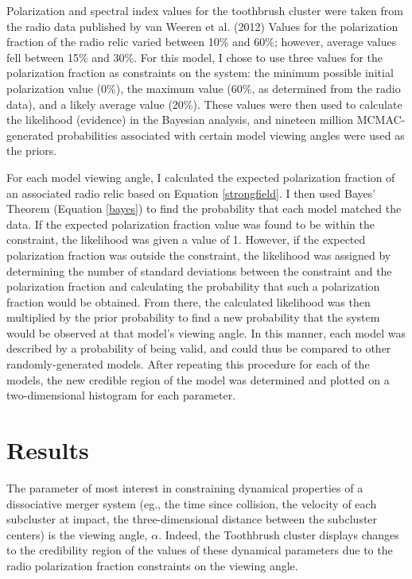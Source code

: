 \documentclass[12 pt]{article}
\begin{document}
Polarization and spectral index values for the toothbrush cluster were taken from the radio data published by van Weeren et al. (2012) Values for the polarization fraction of the radio relic varied between 10\% and 60\%; however, average values fell between 15\% and 30\%. For this model, I chose to use three values for the polarization fraction as constraints on the system: the minimum possible initial polarization value (0\%), the maximum value (60\%, as determined from the radio data), and a likely average value (20\%). These values were then used to calculate the likelihood (evidence) in the Bayesian analysis, and nineteen million MCMAC-generated probabilities associated with certain model viewing angles were used as the priors.

For each model viewing angle, I calculated the expected polarization fraction of an associated radio relic based on Equation \ref{strongfield}. I then used Bayes' Theorem (Equation \ref{bayes}) to find the probability that each model matched the data. If the expected polarization fraction value was found to be within the constraint, the likelihood was given a value of 1. However, if the expected polarization fraction was outside the constraint, the likelihood was assigned by determining the number of standard deviations between the constraint and the polarization fraction and calculating the probability that such a polarization fraction would be obtained. From there, the calculated likelihood was then multiplied by the prior probability to find a new probability that the system would be observed at that model's viewing angle. In this manner, each model was described by a probability of being valid, and could thus be compared to other randomly-generated models. After repeating this procedure for each of the models, the new credible region of the model was determined and plotted on a two-dimensional histogram for each parameter.

\newpage
\section{Results}

The parameter of most interest in constraining dynamical properties of a dissociative merger system (eg., the time since collision, the velocity of each subcluster at impact, the three-dimensional distance between the subcluster centers) is the viewing angle, $\alpha$. Indeed, the Toothbrush cluster displays changes to the credibility region of the values of these dynamical parameters due to the radio polarization fraction constraints on the viewing angle. 
\end{document}
